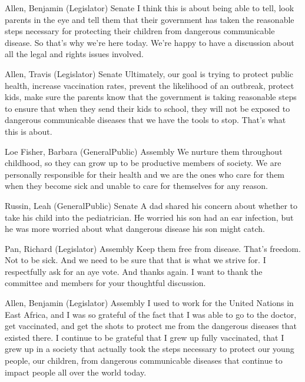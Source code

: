 \begin{result}{9.12646560141058}{Allen, Benjamin (Legislator) Senate}
I think this is about being able to tell, look parents in the eye and tell them that their government has taken the reasonable steps necessary for protecting their children from dangerous communicable disease. So that's why we're here today. We're happy to have a discussion about all the legal and rights issues involved.
\end{result}

\begin{result}{8.329522635997002}{Allen, Travis (Legislator) Senate}
Ultimately, our goal is trying to protect public health, increase vaccination rates, prevent the likelihood of an outbreak, protect kids, make sure the parents know that the government is taking reasonable steps to ensure that when they send their kids to school, they will not be exposed to dangerous communicable diseases that we have the tools to stop. That's what this is about.
\end{result}

\begin{result}{8.24813049999738}{Loe Fisher, Barbara (GeneralPublic) Assembly}
We nurture them throughout childhood, so they can grow up to be productive members of society. We are personally responsible for their health and we are the ones who care for them when they become sick and unable to care for themselves for any reason.
\end{result}

\begin{result}{7.732741683780548}{Russin, Leah (GeneralPublic) Senate}
A dad shared his concern about whether to take his child into the pediatrician. He worried his son had an ear infection, but he was more worried about what dangerous disease his son might catch.
\end{result}

\begin{result}{7.507806725182068}{Pan, Richard (Legislator) Assembly}
Keep them free from disease. That's freedom. Not to be sick. And we need to be sure that that is what we strive for. I respectfully ask for an aye vote. And thanks again. I want to thank the committee and members for your thoughtful discussion.
\end{result}

\begin{result}{7.478195606316017}{Allen, Benjamin (Legislator) Assembly}
I used to work for the United Nations in East Africa, and I was so grateful of the fact that I was able to go to the doctor, get vaccinated, and get the shots to protect me from the dangerous diseases that existed there. I continue to be grateful that I grew up fully vaccinated, that I grew up in a society that actually took the steps necessary to protect our young people, our children, from dangerous communicable diseases that continue to impact people all over the world today.
\end{result}

